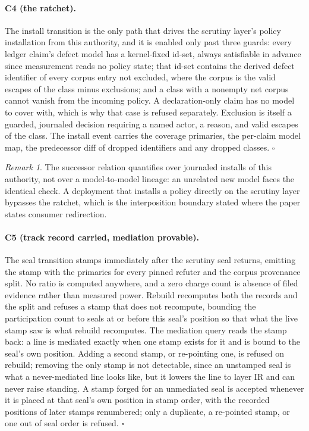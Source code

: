 \documentclass[11pt,a4paper]{article}
\theoremstyle{plain}
\theoremstyle{definition}
\theoremstyle{remark}
\newtheorem*{remark}{Remark}
\begin{document}
\paragraph{C4 (the ratchet).} The install transition is the only path that drives the scrutiny layer's policy installation from this authority, and it is enabled only past three guards: every ledger claim's defect model has a kernel-fixed id-set, always satisfiable in advance since measurement reads no policy state; that id-set contains the derived defect identifier of every corpus entry not excluded, where the corpus is the valid escapes of the class minus exclusions; and a class with a nonempty net corpus cannot vanish from the incoming policy. A declaration-only claim has no model to cover with, which is why that case is refused separately. Exclusion is itself a guarded, journaled decision requiring a named actor, a reason, and valid escapes of the class. The install event carries the coverage primaries, the per-claim model map, the predecessor diff of dropped identifiers and any dropped classes. $\square$

\begin{remark}
The successor relation quantifies over journaled installs of this authority, not over a model-to-model lineage: an unrelated new model faces the identical check. A deployment that installs a policy directly on the scrutiny layer bypasses the ratchet, which is the interposition boundary stated where the paper states consumer redirection.
\end{remark}

\paragraph{C5 (track record carried, mediation provable).} The seal transition stamps immediately after the scrutiny seal returns, emitting the stamp with the primaries for every pinned refuter and the corpus provenance split. No ratio is computed anywhere, and a zero charge count is absence of filed evidence rather than measured power. Rebuild recomputes both the records and the split and refuses a stamp that does not recompute, bounding the participation count to seals at or before this seal's position so that what the live stamp saw is what rebuild recomputes. The mediation query reads the stamp back: a line is mediated exactly when one stamp exists for it and is bound to the seal's own position. Adding a second stamp, or re-pointing one, is refused on rebuild; removing the only stamp is not detectable, since an unstamped seal is what a never-mediated line looks like, but it lowers the line to layer IR and can never raise standing. A stamp forged for an unmediated seal is accepted whenever it is placed at that seal's own position in stamp order, with the recorded positions of later stamps renumbered; only a duplicate, a re-pointed stamp, or one out of seal order is refused. $\square$
\end{document}
